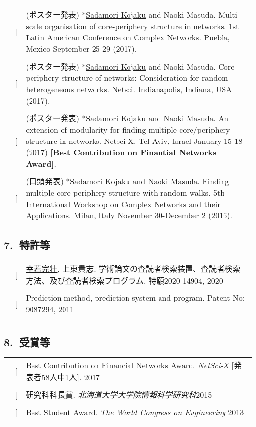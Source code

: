 \documentclass[letterpaper, 11pt]{article}
\newcounter{papercount}
\newcounter{papertype}
\newcommand{\changepapertype}{\setcounter{papercount}{0}\stepcounter{papertype}}
\newcommand{\paperitem}{%
\stepcounter{papercount}%
{\color{OliveGreen}{[\arabic{papertype}.\thepapercount}]}
}
\begin{document}
\begin{longtable}{p{0in}p{2em}p{5.5in}}
    & & \\
    &\paperitem & (ポスター発表) *\underline{Sadamori Kojaku} and Naoki Masuda. Multi-scale organisation of core-periphery structure in networks. 1st Latin American Conference on Complex Networks. Puebla, Mexico September 25-29 (2017).\\
    & & \\
    &\paperitem & (ポスター発表) *\underline{Sadamori Kojaku} and Naoki Masuda. Core-periphery structure of networks: Consideration for random heterogeneous networks. Netsci. Indianapolis, Indiana, USA (2017).\\
    & & \\
    &\paperitem & (ポスター発表) *\underline{Sadamori Kojaku} and Naoki Masuda. An extension of modularity for finding multiple core/periphery structure in networks. Netsci-X. Tel Aviv, Israel January 15-18 (2017) {\bf [Best Contribution on Finantial Networks Award]}.\\
    & & \\
    &\paperitem & (口頭発表) *\underline{Sadamori Kojaku} and Naoki Masuda. Finding multiple core-periphery structure with random walks. 5th International Workshop on Complex Networks and their Applications. Milan, Italy November 30-December 2 (2016).\\
\end{longtable}

\subsection*{7.~特許等}
\changepapertype
\begin{longtable}{p{0in}p{2em}p{5.5in}}
    & \paperitem & \underline{幸若完壮}, 上東貴志. 学術論文の査読者検索装置、査読者検索方法、及び査読者検索プログラム. 特願2020-14904, 2020\\
    & &\\
    & \paperitem & Prediction method, prediction system and program. Patent No: 9087294, 2011\\
    & & \\
\end{longtable}


\subsection*{8.~受賞等}
\changepapertype

\begin{longtable}{p{0in}p{2em}p{5.5in}}
    &\paperitem & Best Contribution on Financial Networks Award. \textit{NetSci-X} {[発表者58人中1人]}. \hfill 2017\\
    & & \\
    &\paperitem & 研究科科長賞. \textit{北海道大学大学院情報科学研究科}\hfill 2015 \\
    & & \\
    &\paperitem & Best Student Award. \textit{The World Congress on Engineering} \hfill 2013\\
    & & \\
\end{longtable}
\end{document}
